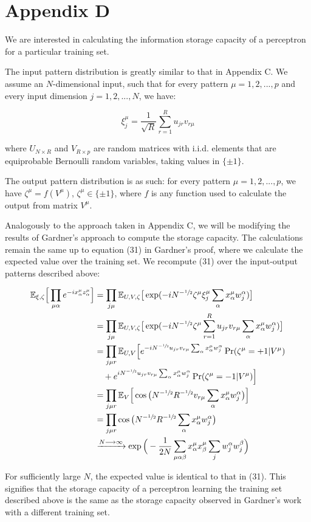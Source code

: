 \section*{Appendix D}


We are interested in calculating the information storage capacity of a perceptron for a particular training set.

The input pattern distribution is greatly similar to that in Appendix C. We assume an $N$-dimensional input, such that for every pattern $\mu = 1, 2, ..., p$ and every input dimension $j = 1, 2, ..., N$, we have:

\begin{equation}
    \xi_j^\mu = \frac{1}{\sqrt{R}} \sum_{r=1}^R u_{j r} v_{r \mu}
\end{equation}

\noindent where $U_{N \times R}$ and $V_{R \times p}$ are random matrices with i.i.d. elements that are equiprobable Bernoulli random variables, taking values in $\{ \pm 1 \}$. 

The output pattern distribution is as such: for every pattern $\mu = 1, 2, ..., p$, we have $\zeta^\mu = f(V^\mu)$, $\zeta^\mu \in \{ \pm 1 \}$, where $f$ is any function used to calculate the output from matrix $V^\mu$.

Analogously to the approach taken in Appendix C, we will be modifying the results of Gardner's approach to compute the storage capacity. The calculations remain the same up to equation (31) in Gardner's proof, where we calculate the expected value over the training set. We recompute (31) over the input-output patterns described above:

\begin{align}
    \mathbb{E}_{\xi, \zeta} \Big[ \prod_{\mu\alpha} e^{-ix_\alpha^\mu z_\alpha^\mu} \Big]
    &= \prod_{j\mu} \mathbb{E}_{U, V, \zeta} \big[ \exp(-i N^{-\sfrac{1}{2}} \zeta^\mu \xi_j^\mu \sum_\alpha x_\alpha^\mu w_{j}^\alpha) \big] \nonumber \\
    &= \prod_{j\mu} \mathbb{E}_{U, V, \zeta} \big[ \exp(-i N^{-\sfrac{1}{2}} \zeta^\mu \sum_{r=1}^R u_{jr} v_{r \mu} \sum_\alpha x_\alpha^\mu w_{j}^\alpha) \big] \nonumber \\
    &= \prod_{j \mu r} \mathbb{E}_{U, V} \Big[ e^{-i N^{-\sfrac{1}{2}} u_{jr} v_{r\mu} \sum_\alpha x_\alpha^\mu w_{j}^\alpha} \Pr (\zeta^\mu = +1 | V^\mu) \nonumber \\
    & \quad + e^{i N^{-\sfrac{1}{2}} u_{jr} v_{r\mu} \sum_\alpha x_\alpha^\mu w_{j}^\alpha} \Pr (\zeta^\mu = -1 | V^\mu) \Big] \nonumber \\
    &= \prod_{j \mu r} \mathbb{E}_{V} \Big[ \cos \big( N^{-\sfrac{1}{2}} R^{-\sfrac{1}{2}} v_{r \mu} \sum_\alpha x_\alpha^\mu w_{j}^\alpha \big) \Big] \nonumber \\
    &= \prod_{j \mu r} \cos \big( N^{-\sfrac{1}{2}} R^{-\sfrac{1}{2}} \sum_\alpha x_\alpha^\mu w_{j}^\alpha \big) \nonumber \\
    &\xrightarrow{N \longrightarrow \infty} \exp \Big( -\frac{1}{2N} \sum_{\mu\alpha\beta} x_\alpha^\mu x_\beta^\mu \sum_j w_j^\alpha w_j^\beta \Big)
\end{align}

For sufficiently large $N$, the expected value is identical to that in (31). This signifies that the storage capacity of a perceptron learning the training set described above is the same as the storage capacity observed in Gardner's work with a different training set.